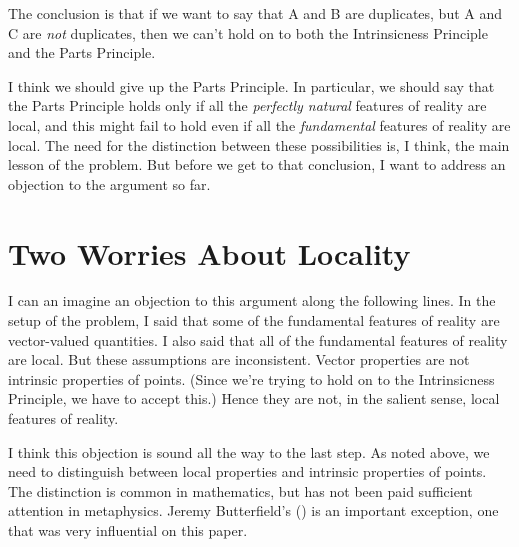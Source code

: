 \documentclass[
  10pt,
  letterpaper,
  DIV=11,
  numbers=noendperiod,
  twoside]{scrartcl}
\begin{document}
The conclusion is that if we want to say that A and B are duplicates,
but A and C are \emph{not} duplicates, then we can't hold on to both the
Intrinsicness Principle and the Parts Principle.

I think we should give up the Parts Principle. In particular, we should
say that the Parts Principle holds only if all the \emph{perfectly
natural} features of reality are local, and this might fail to hold even
if all the \emph{fundamental} features of reality are local. The need
for the distinction between these possibilities is, I think, the main
lesson of the problem. But before we get to that conclusion, I want to
address an objection to the argument so far.

\section{Two Worries About Locality}\label{two-worries-about-locality}

I can an imagine an objection to this argument along the following
lines. In the setup of the problem, I said that some of the fundamental
features of reality are vector-valued quantities. I also said that all
of the fundamental features of reality are local. But these assumptions
are inconsistent. Vector properties are not intrinsic properties of
points. (Since we're trying to hold on to the Intrinsicness Principle,
we have to accept this.) Hence they are not, in the salient sense, local
features of reality.

I think this objection is sound all the way to the last step. As noted
above, we need to distinguish between local properties and intrinsic
properties of points. The distinction is common in mathematics, but has
not been paid sufficient attention in metaphysics. Jeremy Butterfield's
() is an important exception, one
that was very influential on this paper.
\end{document}
